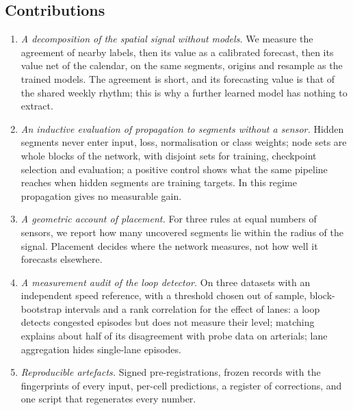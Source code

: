 \subsection{Contributions}
\begin{enumerate}
\item \emph{A decomposition of the spatial signal without models.} We measure the agreement of nearby labels, then its value as a calibrated forecast, then its value net of the calendar, on the same segments, origins and resample as the trained models. The agreement is short, and its forecasting value is that of the shared weekly rhythm; this is why a further learned model has nothing to extract.
\item \emph{An inductive evaluation of propagation to segments without a sensor.} Hidden segments never enter input, loss, normalisation or class weights; node sets are whole blocks of the network, with disjoint sets for training, checkpoint selection and evaluation; a positive control shows what the same pipeline reaches when hidden segments are training targets. In this regime propagation gives no measurable gain.
\item \emph{A geometric account of placement.} For three rules at equal numbers of sensors, we report how many uncovered segments lie within the radius of the signal. Placement decides where the network measures, not how well it forecasts elsewhere.
\item \emph{A measurement audit of the loop detector.} On three datasets with an independent speed reference, with a threshold chosen out of sample, block-bootstrap intervals and a rank correlation for the effect of lanes: a loop detects congested episodes but does not measure their level; matching explains about half of its disagreement with probe data on arterials; lane aggregation hides single-lane episodes.
\item \emph{Reproducible artefacts.} Signed pre-registrations, frozen records with the fingerprints of every input, per-cell predictions, a register of corrections, and one script that regenerates every number.
\end{enumerate}

